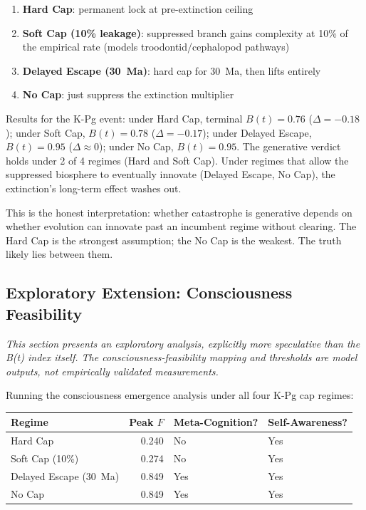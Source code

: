 \documentclass[10pt,letterpaper]{article}
\begin{document}
\begin{enumerate}
\item \textbf{Hard Cap}: permanent lock at pre-extinction ceiling
\item \textbf{Soft Cap (10\% leakage)}: suppressed branch gains complexity
      at 10\% of the empirical rate (models troodontid/cephalopod pathways)
\item \textbf{Delayed Escape (30~Ma)}: hard cap for 30~Ma, then lifts entirely
\item \textbf{No Cap}: just suppress the extinction multiplier
\end{enumerate}

Results for the K-Pg event: under Hard Cap, terminal $B(t) = 0.76$ ($\Delta = -0.18$);
under Soft Cap, $B(t) = 0.78$ ($\Delta = -0.17$); under Delayed Escape,
$B(t) = 0.95$ ($\Delta \approx 0$); under No Cap, $B(t) = 0.95$.
The generative verdict holds under 2 of 4 regimes (Hard and Soft Cap).
Under regimes that allow the suppressed biosphere to eventually innovate
(Delayed Escape, No Cap), the extinction's long-term effect washes out.

This is the honest interpretation: whether catastrophe is generative depends
on whether evolution can innovate past an incumbent regime without clearing.
The Hard Cap is the strongest assumption; the No Cap is the weakest. The truth
likely lies between them.

\subsection*{Exploratory Extension: Consciousness Feasibility}

\emph{This section presents an exploratory analysis, explicitly more speculative
than the B(t) index itself. The consciousness-feasibility mapping and thresholds
are model outputs, not empirically validated measurements.}

Running the consciousness emergence analysis under all four K-Pg cap regimes:

\begin{center}
\begin{tabular}{lrll}
\toprule
Regime & Peak $F$ & Meta-Cognition? & Self-Awareness? \\
\midrule
Hard Cap & 0.240 & No & Yes \\
Soft Cap (10\%) & 0.274 & No & Yes \\
Delayed Escape (30~Ma) & 0.849 & Yes & Yes \\
No Cap & 0.849 & Yes & Yes \\
\bottomrule
\end{tabular}
\end{center}
\end{document}
